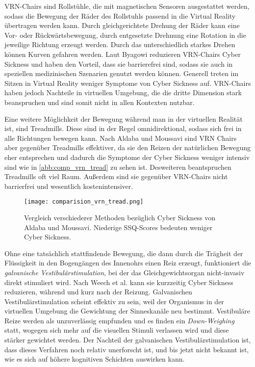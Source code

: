 VRN-Chairs sind Rollst\"uhle, die mit magnetischen Sensoren ausgestattet werden, sodass die Bewegung der R\"ader des Rollstuhls passend in die Virtual Reality \"ubertragen werden kann. Durch gleichgerichtete Drehung der R\"ader kann eine Vor- oder R\"uckw\"artsbewegung, durch entgesetzte Drehnung eine Rotation in die jeweilige Richtung erzeugt werden. Durch das unterschiedlich starkes Drehen k\"onnen Kurven gefahren werden. Laut Byagowi\cite{Byagowi:2014:VRNchair} reduzieren VRN-Chairs Cyber Sickness und haben den Vorteil, dass sie barrierefrei sind, sodass sie auch in speziellen medizinischen Szenarien genutzt werden k\"onnen. Generell treten im Sitzen in Virtual Reality weniger Symptome von Cyber Sickness auf. VRN-Chairs haben jedoch Nachteile in virtuellen Umgebung, die die dritte Dimension stark beanspruchen und sind somit nicht in allen Kontexten nutzbar.

Eine weitere M\"oglichkeit der Bewegung w\"ahrend man in der virtuellen Realit\"at ist, sind Treadmills. Diese sind in der Regel omnidirektional, sodass sich frei in alle Richtungen bewegen kann. Nach Aldaba und Moussavi\cite{Aldaba:2019:VRNTread} sind VRN Chairs aber gegen\"uber Treadmills effektiver, da sie den Reizen der nat\"urlichen Bewegung eher entsprechen und dadurch die Symptome der Cyber Sickness weniger intensiv sind wie in \autoref{abb:comp_vrn_tread} zu sehen ist. Desweiteren beantspruchen Treadmills oft viel Raum. Au{\ss}erdem sind sie gegenüber VRN-Chairs nicht barrierfrei und wesentlich kostenintensiver.

\begin{figure}[tbh]
	\centering 
	\texttt{[image: comparision\_vrn\_tread.png]}
	\caption{Vergleich verschiederer Methoden bez\"uglich Cyber Sickness von Aldaba und Moussavi\cite{Aldaba:2019:VRNTread}. Niederige SSQ-Scores bedeuten weniger Cyber Sickness.}
	\label{abb:comp_vrn_tread}
\end{figure}

Ohne eine tats\"achlich stattfindende Bewegung, die dann durch die Tr\"agheit der Flüssigkeit in den Bogeng\"angen des Innenohrs einen Reiz erzeugt, funktioniert die \textit{galvanische Vestibul\"arstimulation}, bei der das Gleichgewichtsorgan nicht-invasiv direkt stimuliert wird. Nach Weech et al.\cite{Weech:2020:GVS} kann sie kurzzeitig Cyber Sickness reduzieren, w\"ahrend und kurz nach der Reizung.
Galvanischen Vestibul\"arstimulation scheint effektiv zu sein, weil der Organismus in der virtuellen Umgebung die Gewichtung der Sinneskan\"ale neu bestimmt. Vestibul\"are Reize werden als unzuverl\"assig empfunden und es finden ein \textit{Down-Weighing} statt, wogegen sich mehr auf die visuellen Stimuli verlassen wird und diese st\"arker gewichtet werden.
Der Nachteil der galvanischen Vestibul\"arstimulation ist, dass dieses Verfahren noch relativ unerforscht ist, und bis jetzt nicht bekannt ist, wie es sich auf h\"ohere kognitiven Schichten auswirken kann.

